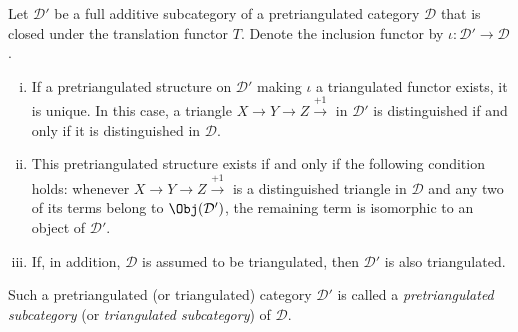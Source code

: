 \begin{definition-proposition}\label{def:triangulated-subcat}
	Let $\mathcal{D}'$ be a full additive subcategory of a pretriangulated
	category $\mathcal{D}$ that is closed under the translation functor $T$.
	Denote the inclusion functor by
	$\iota: \mathcal{D}' \to \mathcal{D}$.
	\begin{enumerate}[(i)]
		\item If a pretriangulated structure on $\mathcal{D}'$ making $\iota$
		a triangulated functor exists, it is unique. In this case, a triangle
		$X \to Y \to Z \xrightarrow{+1}$ in $\mathcal{D}'$ is distinguished
		if and only if it is distinguished in $\mathcal{D}$.
		\item This pretriangulated structure exists if and only if the
		following condition holds: whenever
		$X \to Y \to Z \xrightarrow{+1}$ is a distinguished triangle in
		$\mathcal{D}$ and any two of its terms belong to
		$\Obj(\mathcal{D}')$, the remaining term is isomorphic to an object of
		$\mathcal{D}'$.
		\item If, in addition, $\mathcal{D}$ is assumed to be triangulated,
		then $\mathcal{D}'$ is also triangulated.
	\end{enumerate}

	Such a pretriangulated (or triangulated) category $\mathcal{D}'$ is called
	a \emph{pretriangulated subcategory} (or \emph{triangulated subcategory})
	of $\mathcal{D}$.
\end{definition-proposition}

